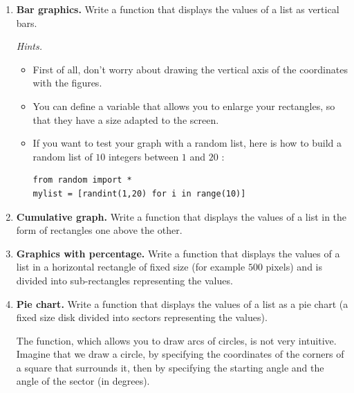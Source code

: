 \documentclass[11pt,class=report,crop=false]{standalone}
\begin{document}
\begin{activite}[Graphics]
\begin{enumerate}
  \item \textbf{Bar graphics.} Write a function  that displays the values of a list as vertical bars.
  


 \emph{Hints.}
  \begin{itemize}
    \item First of all, don't worry about drawing the vertical axis of the coordinates with the figures.
    \item You can define a variable  that allows you to enlarge your rectangles, so that they have a size adapted to the screen.
    \item If you want to test your graph with a random list, here is how to build a random list of $10$ integers between $1$ and $20$ :
    
\begin{lstlisting}
from random import *
mylist = [randint(1,20) for i in range(10)]
\end{lstlisting}

\end{itemize}

  \item \textbf{Cumulative graph.} Write a function  that displays the values of a list in the form of rectangles one above the other.
  

  
  \item \textbf{Graphics with percentage.} Write a function  that displays the values of a list in a horizontal rectangle of fixed size (for example $500$ pixels) and is divided into sub-rectangles representing the values.
  


  \item \textbf{Pie chart.} Write a function  that displays the values of a list as a pie chart (a fixed size disk divided into sectors representing the values). 
 
The   function, which allows you to draw arcs of circles, is not very intuitive. Imagine that we draw a circle, by specifying the coordinates of the corners of a square that surrounds it, then by specifying the starting angle and the angle of the sector (in degrees). 




\end{enumerate}
\end{activite}
\end{document}
